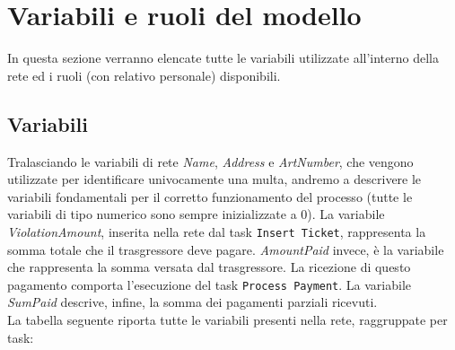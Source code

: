 \documentclass[../Relazione.tex]{subfiles}
\begin{document}
\section{Variabili e ruoli del modello}
    In questa sezione verranno elencate tutte le variabili utilizzate all'interno della rete ed i ruoli (con relativo personale) disponibili.
    
    \subsection{Variabili}
    Tralasciando le variabili di rete \textit{Name}, \textit{Address} e \textit{ArtNumber}, che vengono utilizzate per identificare univocamente una multa, andremo a descrivere le variabili fondamentali per il corretto funzionamento del processo (tutte le variabili di tipo numerico sono sempre inizializzate a 0).
    La variabile \textit{ViolationAmount}, inserita nella rete dal task \texttt{Insert Ticket}, rappresenta la somma totale che il trasgressore deve pagare.
    \textit{AmountPaid} invece, è la variabile che rappresenta la somma versata dal trasgressore. La ricezione di questo pagamento comporta l'esecuzione del task \texttt{Process Payment}.
    La variabile \textit{SumPaid} descrive, infine, la somma dei pagamenti parziali ricevuti.\\
    La tabella seguente riporta tutte le variabili presenti nella rete, raggruppate per task:
    
\end{document}
